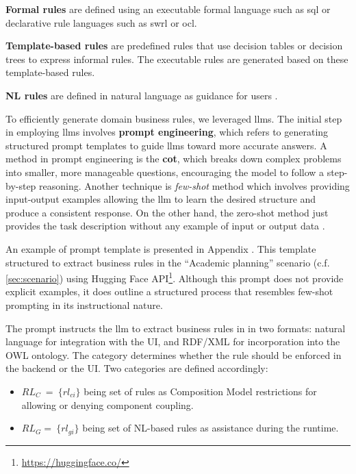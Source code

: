 \textbf{Formal rules} are defined using an executable formal language
such as \gls{sql} or declarative rule languages such as \gls{swrl} or \gls{ocl}.

\textbf{Template-based rules} are predefined rules that use decision
tables or decision trees to express informal rules. The executable rules
are generated based on these template-based rules.

\textbf{NL rules} are defined in natural language as guidance for users
\autocite{Kalibatiene2010}.

To efficiently generate domain business rules, we leveraged \gls{llm}s. The
initial step in employing \gls{llm}s involves \textbf{prompt engineering},
which refers to generating structured prompt templates to guide \gls{llm}s
toward more accurate answers. A method in prompt engineering is the
\textbf{\gls{cot}}, which breaks down complex problems into
smaller, more manageable questions, encouraging the model to follow a
step-by-step reasoning. Another technique is \emph{few-shot} method
which involves providing input-output examples allowing the \gls{llm} to learn
the desired structure and produce a consistent response. On the other
hand, the zero-shot method just provides the task description without
any example of input or output data \autocite{Crum2024}.

An example of prompt template is presented in Appendix . This template
structured to extract business rules in the ``Academic planning''
scenario (c.f. \cref{sec:scenario}) using Hugging Face API\footnote{\url{https://huggingface.co/}}.
Although this prompt does not provide explicit examples, it does outline
a structured process that resembles few-shot prompting in its
instructional nature.

The prompt instructs the \gls{llm} to extract business rules in in two
formats: natural language for integration with the UI, and RDF/XML for
incorporation into the OWL ontology. The category determines whether the
rule should be enforced in the backend or the UI. Two categories are
defined accordingly:

\begin{itemize}
\item
  \({RL}_{C}\  = \ \{{rl}_{ci}\}\) being set of rules as Composition
  Model restrictions for allowing or denying component coupling.
\item
  \({RL}_{G} = \ \{{rl}_{gi}\}\) being set of NL-based rules as
  assistance during the runtime.
\end{itemize}

